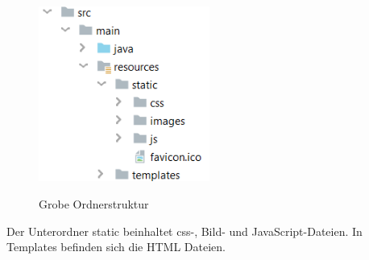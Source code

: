 \begin{figure}[H]
    \centering
    \begin{minipage}[H]{1\textwidth}
        \caption{Grobe Ordnerstruktur}
        \includegraphics[width=0.5\textwidth]{img/resources-ordner.png}\\
        \label{fig:resources-ordner}
    \end{minipage}
\end{figure}

Der Unterordner static beinhaltet css-, Bild- und JavaScript-Dateien. In Templates befinden sich die HTML Dateien.


